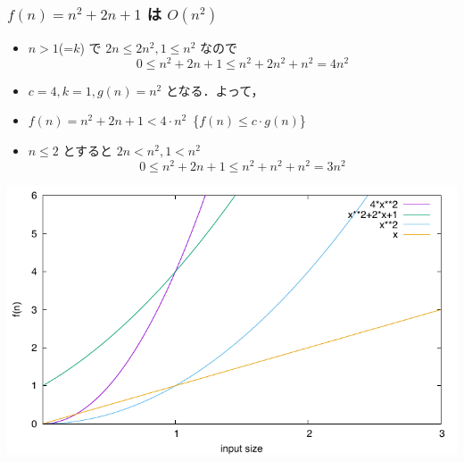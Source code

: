 \begin{frame}[shrink]
\frametitle{\(f(n)=n^2+2n+1\) は \(O(n^2)\)}
  \begin{itemize}
\item \(n>1\)(=\(k\)) で \(2n\leq 2n^2, 1\leq n^2\) なので
    \begin{displaymath}
0\leq n^2+2n+1\leq n^2+2n^2+n^2= 4n^2
    \end{displaymath}
\item \(c=4, k=1, g(n)=n^2\) となる．よって，
\item \(f(n)=n^2+2n+1<4\cdot n^2\)\ \textemdash\{\(f(n)\leq c\cdot g(n)\)\}
\item \(n\leq 2\) とすると \(2n<n^2, 1<n^2\) 
    \begin{displaymath}
0\leq n^2+2n+1\leq n^2+n^2+n^2= 3n^2
    \end{displaymath}
  \end{itemize}
  \begin{center}
\includegraphics[scale=0.6]{./progs/witness.pdf}
  \end{center}
\end{frame}
